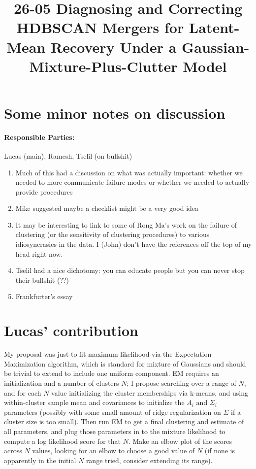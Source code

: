 \documentclass[11pt]{article}
\begin{document}
\title{26-05 Diagnosing and Correcting HDBSCAN Mergers for Latent-Mean
  Recovery Under a Gaussian-Mixture-Plus-Clutter Model}

\maketitle

\section{Some minor notes on discussion}

\paragraph{Responsible Parties:} Lucas (main), Ramesh, Tselil (on bullshit)

\begin{enumerate}[1.]
\item Much of this had a discussion on what was actually important: whether
  we needed to more communicate failure modes or whether we needed to
  actually provide procedures
\item Mike suggested maybe a checklist might be a very good idea
\item It may be interesting to link to some of Rong Ma's work on the failure
  of clustering (or the sensitivity of clustering procedures) to various
  idiosyncrasies in the data.
  I (John) don't have the references off the top of my head right now.
\item Tselil had a nice dichotomy: you can educate people but you can never
  stop their bullshit (??)
\item Frankfurter's essay~\cite{Frankfurt86}
\end{enumerate}

\section{Lucas' contribution}
My proposal was just to fit maximum likelihood via the Expectation-Maximization algorithm, which is standard for mixture of Gaussians and should be trivial to extend to include one uniform component. EM requires an initialization and a number of clusters $N$; I propose searching over a range of $N$, and for each $N$ value initializing the cluster memberships via k-means, and using within-cluster sample mean and covariances to initialize the $A_i$ and $\Sigma_i$ parameters (possibly with some small amount of ridge regularization on $\Sigma$ if a cluster size is too small). Then run EM to get a final clustering and estimate of all parameters, and plug those parameters in to the mixture likelihood to compute a log likelihood score for that $N$. Make an elbow plot of the scores across $N$ values, looking for an elbow to choose a good value of $N$ (if none is apparently in the initial $N$ range tried, consider extending its range). 
\end{document}
